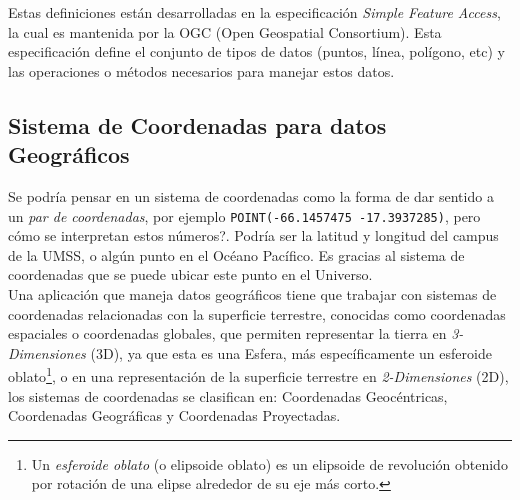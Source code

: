 

    Estas definiciones están desarrolladas en la especificación \emph{Simple Feature Access}, la cual es mantenida por la OGC (Open Geospatial Consortium). Esta especificación define el conjunto de tipos de datos (puntos, línea, polígono, etc) y las operaciones o métodos necesarios para manejar estos datos. \cite[p. 8--11]{simpleFeatureAccess}


  \subsection{Sistema de Coordenadas para datos Geográficos} %
  \label{sec:sistema_de_coordenadas_para_datos_geograficos}
    Se podría pensar en un sistema de coordenadas como la forma de dar sentido a un \emph{par de coordenadas}, por ejemplo \verb|POINT(-66.1457475 -17.3937285)|, pero cómo se interpretan estos números?.
    Podría ser la latitud y longitud del campus de la UMSS, o algún punto en el Océano Pacífico. Es gracias al sistema de coordenadas que se puede ubicar este punto en el Universo.\\


    Una aplicación que maneja datos geográficos tiene que trabajar con sistemas de coordenadas relacionadas con la superficie terrestre, conocidas como coordenadas espaciales o coordenadas globales, que permiten representar la tierra en \emph{3-Dimensiones} (3D), ya que esta es una Esfera, más específicamente un esferoide oblato\footnote{Un \emph{esferoide oblato} (o elipsoide oblato) es un elipsoide de revolución obtenido por rotación de una elipse alrededor de su eje más corto.}, o en una representación de la superficie terrestre en \emph{2-Dimensiones} (2D), los sistemas de coordenadas se clasifican en: Coordenadas Geocéntricas, Coordenadas Geográficas y Coordenadas Proyectadas. \cite{danielAzuma}

